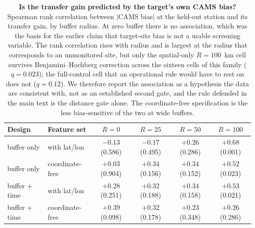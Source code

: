 \documentclass[11pt]{article}
\begin{document}
\begin{table}[htbp]\centering\footnotesize
\caption{\textbf{Is the transfer gain predicted by the target's own CAMS bias?} Spearman rank correlation between $|$CAMS bias$|$ at the held-out station and its transfer gain, by buffer radius. At zero buffer there is no association, which was the basis for the earlier claim that target-site bias is not a usable screening variable. The rank correlation rises with radius and is largest at the radius that corresponds to an unmonitored site, but only the spatial-only $R=100$~km cell survives Benjamini--Hochberg correction across the sixteen cells of this family ($q=0.023$); the full-control cell that an operational rule would have to rest on does not ($q=0.12$). We therefore report the association as a hypothesis the data are consistent with, not as an established second gate, and the rule defended in the main text is the distance gate alone. The coordinate-free specification is the less bias-sensitive of the two at wide buffers.}
\begin{tabular}{llcccc}\toprule
Design & Feature set & $R=0$ & $R=25$ & $R=50$ & $R=100$ \\ \midrule
buffer only & with lat/lon & $-0.13$ (0.586) & $-0.17$ (0.495) & $+0.26$ (0.286) & $+0.68$ (0.001) \\
buffer only & coordinate-free & $+0.03$ (0.904) & $+0.34$ (0.156) & $+0.34$ (0.152) & $+0.52$ (0.023) \\
buffer $+$ time & with lat/lon & $+0.28$ (0.251) & $+0.32$ (0.188) & $+0.34$ (0.158) & $+0.53$ (0.021) \\
buffer $+$ time & coordinate-free & $+0.39$ (0.098) & $+0.32$ (0.178) & $+0.23$ (0.348) & $+0.26$ (0.286) \\
\bottomrule\end{tabular}\end{table}
\end{document}
